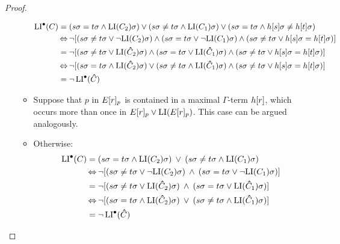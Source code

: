 \begin{proof}
\begin{itemize}
\begin{itemize}
			\hspace*{\dimexpr-\leftmargini-1em}\parbox{\linewidth}{%
				\begin{align*}
					\operatorname{LI}^\bullet(C) 
					&= ({s\sigma=t\sigma} \land {\operatorname{LI}(C_2)\sigma} ) \lor ({s\sigma\neq t\sigma} \land {\operatorname{LI}(C_1)\sigma}) \lor ({s\sigma=t\sigma} \land {h\ensuremath{[s]}\sigma \neq h\ensuremath{[t]}\sigma}) \\
					&\operatorname{\Leftrightarrow} \lnot [ ({s\sigma\neq t\sigma} \lor \lnot {\operatorname{LI}(C_2)\sigma} ) \land ({s\sigma= t\sigma} \lor \lnot{\operatorname{LI}(C_1)\sigma}) \land ({s\sigma\neq t\sigma} \lor {h\ensuremath{[s]}\sigma = h\ensuremath{[t]}\sigma}) ] \\
					&= \lnot [ ({s\sigma\neq t\sigma} \lor {\operatorname{LI}(\bm\hat C_2)\sigma} ) \land ({s\sigma= t\sigma} \lor {\operatorname{LI}(\bm\hat C_1)\sigma}) \land ({s\sigma\neq t\sigma} \lor {h\ensuremath{[s]}\sigma = h\ensuremath{[t]}\sigma}) ] \\
					&\operatorname{\Leftrightarrow} \lnot [ ({s\sigma= t\sigma} \land {\operatorname{LI}(\bm\hat C_2)\sigma} ) \lor ({s\sigma\neq t\sigma} \land {\operatorname{LI}(\bm\hat C_1)\sigma}) \land ({s\sigma\neq t\sigma} \lor {h\ensuremath{[s]}\sigma = h\ensuremath{[t]}\sigma}) ]\\
					&= \lnot \operatorname{LI}^\bullet(\bm\hat C)
				\end{align*}
			}\par

		\item Suppose that $p$ in $E{[r]_{p}}$ is contained in a maximal $\Gamma$-term $h[r]$, which occurs more than once in $E{[r]_{p}} \lor \operatorname{LI}(E{[r]_{p}})$. 
			This case can be argued analogously.

		\item Otherwise:
			\begin{align*}
				\operatorname{LI}^\bullet(C) 
				&= ({s\sigma=t\sigma} \land {\operatorname{LI}(C_2)\sigma} ) \;\,{\lor}\;\, ({s\sigma\neq t\sigma} \land {\operatorname{LI}(C_1)\sigma}) \\
				&\operatorname{\Leftrightarrow} \lnot [ ({s\sigma\neq t\sigma} \lor \lnot {\operatorname{LI}(C_2)\sigma} ) \;\,{\land}\;\, ({s\sigma= t\sigma} \lor \lnot {\operatorname{LI}(C_1)\sigma}) ] \\
				&= \lnot [ ({s\sigma\neq t\sigma} \lor {\operatorname{LI}(\bm\hat C_2)\sigma} ) \;\,{\land}\;\, ({s\sigma= t\sigma} \lor {\operatorname{LI}(\bm\hat C_1)\sigma}) ] \\
				&\operatorname{\Leftrightarrow} \lnot [ ({s\sigma= t\sigma} \land {\operatorname{LI}(\bm\hat C_2)\sigma} ) \;\,{\lor}\;\, ({s\sigma\neq t\sigma} \land {\operatorname{LI}(\bm\hat C_1)\sigma}) ] \\
				&= \lnot \operatorname{LI}^\bullet(\bm\hat C)
			\end{align*}


\end{itemize}
\end{itemize}
\end{proof}
